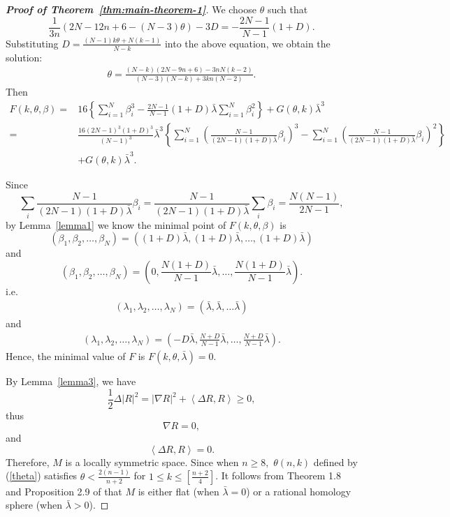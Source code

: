 \documentclass[11pt, reqno]{amsart}
\numberwithin{equation}{section}
\theoremstyle{definition}
\begin{document}
\begin{proof}[\textbf{Proof of Theorem~\ref{thm:main-theorem-1}}]
		We choose $\theta $ such that 
		\[\frac{1}{3n}(2N-12n+6-(N-3)\theta )-3D=-\frac{2N-1}{N-1}(1+D).\]
		Substituting $D=\frac{(N-1)k\theta +N(k-1)}{N-k}$ into the above equation, we obtain the solution:
		\begin{eqnarray}\label{theta}
			\theta =\frac{(N-k)(2N-9n+6)-3nN(k-2)}{(N-3)(N-k)+3kn(N-2)}.
		\end{eqnarray}
		Then \begin{align*}
			F(k,\theta ,\beta )=&16\left\{\sum\limits_{i=1}^{N}{\beta _{i}^3}-\frac{2N-1}{N-1}(1+D)\bar{\lambda }\sum\limits_{i=1}^{N}{\beta _{i}^2}\right\}+G(\theta ,k){{{\bar{\lambda }}}^3} \\ 
			=&\frac{16(2N-1)^3(1+D)^3}{(N-1)^3}\bar{\lambda }^3\left\{\sum\limits_{i=1}^{N}{\left( \frac{N-1}{(2N-1)(1+D)\bar{\lambda }}{\beta }_i \right)^3}-\sum\limits_{i=1}^{N}{\left( \frac{N-1}{(2N-1)(1+D)\bar{\lambda }}{\beta }_i \right)^2}\right\}\\
			&+G(\theta ,k){\bar{\lambda }}^3. 
		\end{align*}
		
		Since 
		\[\sum\limits_{i}{\frac{N-1}{(2N-1)(1+D)\bar{\lambda }}{{\beta }_{i}}}=\frac{N-1}{(2N-1)(1+D)\bar{\lambda }}\sum\limits_{i}{{{\beta }_{i}}}=\frac{N(N-1)}{2N-1},\]
		by Lemma~\ref{lemma1} we know the minimal point of $F(k,\theta ,\beta )$ is 
		$$(\beta_1,\beta_2,\ldots,\beta_N)=\left( (1+D)\bar{\lambda },(1+D)\bar{\lambda },\ldots ,(1+D)\bar{\lambda } \right)$$
		and $$(\beta_1,\beta_2,\ldots,\beta_N)=\left( 0,\frac{N(1+D)}{N-1}\bar{\lambda },\ldots ,\frac{N(1+D)}{N-1}\bar{\lambda } \right).$$
		i.e.
		\begin{eqnarray}
			(\lambda_1,\lambda_2,\ldots,\lambda_N)=(\bar{\lambda },\bar{\lambda },\ldots \bar{\lambda }) \label{point1}
		\end{eqnarray}
		and
		\begin{eqnarray}
			(\lambda_1,\lambda_2,\ldots,\lambda_N)=(-D\bar{\lambda },\frac{N+D}{N-1}\bar{\lambda },\ldots ,\frac{N+D}{N-1}\bar{\lambda })\label{point2}.
		\end{eqnarray}
		Hence, the minimal value of $F$ is $F(k,\theta ,\bar{\lambda })=0.$
		
		By Lemma~\ref{lemma3}, we have
		$$\frac{1}{2}\Delta {{\left| R \right|}^{2}}={{\left| \nabla R \right|}^{2}}+\left\langle \Delta R,R \right\rangle \ge 0,$$
		thus $$\nabla R=0,$$
		and $$\left\langle \Delta R,R \right\rangle =0.$$
		Therefore, $M$ is a locally symmetric space. Since when $n\ge 8,$ $\theta(n,k)$ defined by (\ref{theta}) satisfies $\theta < \frac{2(n-1)}{n+2}$ for $1\le k\le \left[ \frac{n+2}{4} \right]$. It follows from Theorem 1.8 and Proposition 2.9 of \cite{Li5} that $M$ is either flat (when $\bar{\lambda }=0$) or a rational homology sphere (when $\bar{\lambda }>0$).
		

\end{proof}
\end{document}
